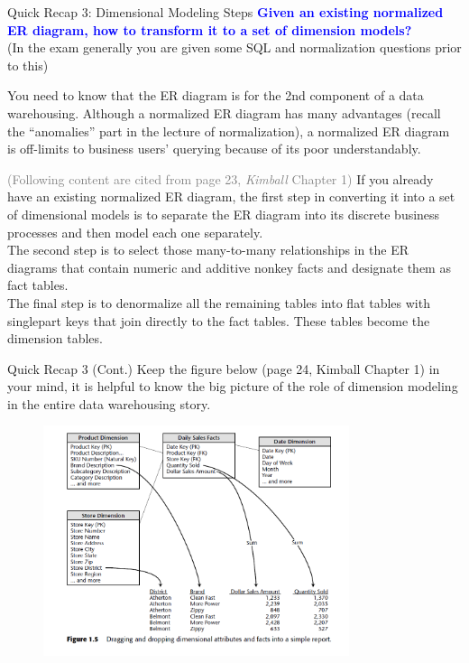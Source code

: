 \begin{frame}[fragile]{Quick Recap 3: Dimensional Modeling Steps}
\textcolor{blue}{\textbf{Given an existing normalized ER diagram, how to transform it to a set of dimension models?}} \\\vspace{3pt}
{\scriptsize (In the exam generally you are given some SQL and normalization questions prior to this)}\\\vspace{3pt}
\begin{small}
You need to know that the ER diagram is for the 2nd component of a data warehousing. 
Although a normalized ER diagram has many advantages (recall the ``anomalies'' part in the lecture of normalization), a normalized ER diagram is off-limits to business users' querying because of its poor understandably.\\\vspace{3pt}

\textcolor{gray}{(Following content are cited from page 23, \textit{Kimball} Chapter 1)}
If you already have an existing normalized ER diagram, the first step in converting it into a set of dimensional models is to separate the ER diagram into its discrete business processes and then model each one separately. \\\vspace{3pt}
The second step is to select those many-to-many relationships in the ER diagrams that contain numeric and additive nonkey facts and designate them as fact tables. \\\vspace{3pt}
The final step is to denormalize all the remaining tables into flat tables with singlepart keys that join directly to the fact tables. These tables become the dimension tables.
\end{small}
\end{frame}

\begin{frame}[fragile]{Quick Recap 3 (Cont.)}
Keep the figure below (page 24, Kimball Chapter 1) in your mind, it is helpful to know the big picture of the role of dimension modeling in the entire data warehousing story.\\
\begin{figure}
	\includegraphics[width=0.8\textwidth, trim=0 0 0 0, clip]{t9/images/design.png}
\end{figure}	
\end{frame}

